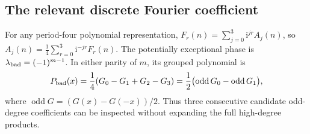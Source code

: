 \documentclass[11pt]{article}
\theoremstyle{definition}
\theoremstyle{remark}
\newcommand{\ii}{\mathrm i}
\theoremstyle{definition}
\theoremstyle{plain}
\numberwithin{equation}{section}
\begin{document}
\subsection{The relevant discrete Fourier coefficient}
For any period-four polynomial representation,
$F_r(n)=\sum_{j=0}^3\ii^{jr}A_j(n)$, so
$A_j(n)=\frac14\sum_{r=0}^3\ii^{-jr}F_r(n)$.
The potentially exceptional phase is
$\lambda_{\rm bad}=(-1)^{m-1}$. In either parity of $m$, its grouped
polynomial is
\begin{equation}
 P_{\rm bad}(x)=\frac14(G_0-G_1+G_2-G_3)
 =\frac12\bigl(\operatorname{odd}G_0-\operatorname{odd}G_1\bigr),
 \label{cp:eq:badFourier}
\end{equation}
where $\operatorname{odd}G=(G(x)-G(-x))/2$.
Thus three consecutive candidate odd-degree coefficients can be inspected
without expanding the full high-degree products.
\end{document}
